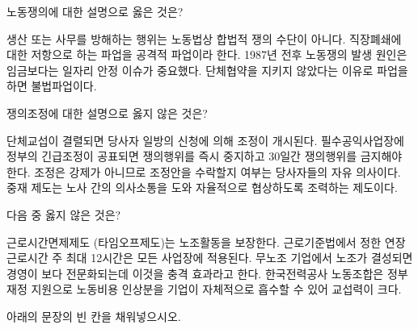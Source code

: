 \documentclass[11pt,answers]{exam}
\begin{document}
\begin{questions}
\question[2] 노동쟁의에 대한 설명으로 옳은 것은?
    \begin{choices}
    \choice\relax 생산 또는 사무를 방해하는 행위는 노동법상 합법적 쟁의 수단이 아니다.
    \choice\relax 직장폐쇄에 대한 저항으로 하는 파업을 공격적 파업이라 한다.
    \choice\relax 1987년 전후 노동쟁의 발생 원인은 임금보다는 일자리 안정 이슈가 중요했다.
    \CorrectChoice\relax 단체협약을 지키지 않았다는 이유로 파업을 하면 불법파업이다.
    \end{choices}

\question[2] 쟁의조정에 대한 설명으로 옳지 않은 것은?
    \begin{choices}
    \choice\relax 단체교섭이 결렬되면 당사자 일방의 신청에 의해 조정이 개시된다.
    \choice\relax 필수공익사업장에 정부의 긴급조정이 공표되면 쟁의행위를 즉시 중지하고 30일간 쟁의행위를 금지해야 한다.
    \choice\relax 조정은 강제가 아니므로 조정안을 수락할지 여부는 당사자들의 자유 의사이다.
    \CorrectChoice\relax 중재 제도는 노사 간의 의사소통을 도와 자율적으로 협상하도록 조력하는 제도이다.
    \end{choices}

\question[2] 다음 중 옳지 않은 것은?
    \begin{choices}
    \choice\relax 근로시간면제제도 (타임오프제도)는 노조활동을 보장한다.
    \CorrectChoice\relax 근로기준법에서 정한 연장근로시간 주 최대 12시간은 모든 사업장에 적용된다.
    \choice\relax 무노조 기업에서 노조가 결성되면 경영이 보다 전문화되는데 이것을 충격 효과라고 한다.
    \choice\relax 한국전력공사 노동조합은 정부 재정 지원으로 노동비용 인상분을 기업이 자체적으로 흡수할 수 있어 교섭력이 크다.
    \end{choices}

\pagebreak

{\large
    아래의 문장의 빈 칸을 채워넣으시오.
}


\end{questions}
\end{document}
